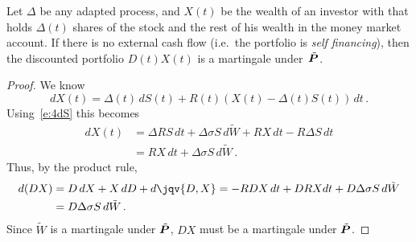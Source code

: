 \begin{lemma}
  Let $\Delta$ be any adapted process, and $X(t)$ be the wealth of an investor with that holds $\Delta(t)$ shares of the stock and the rest of his wealth in the money market account.
  If there is no external cash flow (i.e.\ the portfolio is \emph{self financing}), then the discounted portfolio $D(t) X(t)$ is a martingale under~$\tilde\P$.
\end{lemma}
\begin{proof}
  We know 
  \begin{equation*}
    dX(t) = \Delta(t) \, dS(t) + R(t) (X(t) - \Delta(t) S(t)) \, dt\,.
  \end{equation*}
  Using~\eqref{e:4dS} this becomes
  \begin{align*}
    dX(t) &= \Delta R S \, dt + \Delta \sigma S \, d\tilde W
      + R X \, dt - R \Delta S \, dt
    \\
      &= RX \, dt + \Delta \sigma S \, d\tilde W\,.
  \end{align*}
  Thus, by the product rule,
  \begin{align*}
    d(DX) &= D \, dX + X \, dD + d\jqv{D,X}
      = -R D X \, dt + D  RX dt + D \Delta \sigma S \, d\tilde W
    \\
      &= D \Delta \sigma S \, d\tilde W\,.
  \end{align*}
  Since $\tilde W$ is a martingale under $\tilde\P$, $DX$ must be a martingale under $\tilde\P$.
\end{proof}

